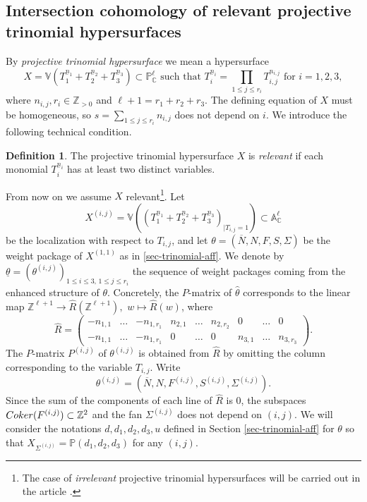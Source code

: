 \documentclass[11pt, reqno]{amsart}
\theoremstyle{plain}
\theoremstyle{definition}
\newtheorem{definition}[theorem]{Definition}
\theoremstyle{remark}
\begin{document}
\subsection{Intersection cohomology of relevant projective trinomial hypersurfaces}
By \emph{projective trinomial hypersurface} we mean a hypersurface
$$X  =  \mathbb{V}(T_{1}^{\underline{n}_{1}} + T_{2}^{\underline{n}_{2}} + T_{3}^{\underline{n}_{3}})\subset \mathbb{P}^{\ell}_{\mathbb{C}}\text{ such that }T_{i}^{\underline{n}_{i}} =  \prod_{1\leq j\leq r_{i}}T_{i, j}^{n_{i, j}} \text{ for }i = 1,2,3,$$
where $n_{i,j}, r_{i}\in\mathbb{Z}_{>0}$ and $\ell + 1 =  r_{1} + r_{2} + r_{3}$. The defining 
equation of $X$ must be homogeneous, so 
$s  =  \sum_{1\leq j\leq r_{i}} n_{i, j}$
does not depend on $i$. We introduce the following technical condition.
\begin{definition}
The projective trinomial hypersurface $X$ is \emph{relevant}
if each monomial $T_{i}^{\underline{n}_{i}}$ has at least two distinct variables.
\end{definition}

From now on we assume $X$ relevant\footnote{The case of \emph{irrelevant} projective trinomial hypersurfaces will be carried out in the article \cite{ABL}.}. Let  
$$X^{(i,j)} =  \mathbb{V}((T^{\underline{n}_{1}}_{1} + T^{\underline{n}_{2}}_{2} + T^{\underline{n}_{3}}_{3})_{|T_{i,j} = 1})\subset \mathbb{A}^{\ell}_{\mathbb{C}}$$
be the localization with respect to $T_{i,j}$, and let 
$\theta  =  (\overline{N}, N, F, S, \Sigma)$
be the weight package of $X^{(1,1)}$ as in \ref{sec-trinomial-aff}. We denote by
$\underline{\theta} =  (\theta^{(i,j)})_{ 1\leq i\leq 3,\,1\leq j\leq r_{i}}$
the sequence of weight packages coming from the enhanced structure of $\theta$.
Concretely, the $P$-matrix of $\widehat{\theta}$ corresponds to the linear map 
$\mathbb{Z}^{\ell+1}\rightarrow \widehat{R}(\mathbb{Z}^{\ell+1}),$ $w \mapsto \widehat{R}(w)$, where
$$ \widehat{R} =  \begin{pmatrix}
 -n_{1,1}& \ldots &  -n_{1, r_{1}} &  n_{2,1} &\ldots & n_{2,r_{2}} & 0& \ldots & 0\\
  -n_{1,1}& \ldots  &  -n_{1, r_{1}} &  0 &\ldots & 0 & n_{3,1} & \ldots & n_{3, r_{3}} 
\end{pmatrix}.$$
The $P$-matrix $P^{(i,j)}$ of $\theta^{(i,j)}$
is obtained from $\widehat{R}$ by omitting the column corresponding to the variable $T_{i,j}$. Write 
$$\theta^{(i,j)} = (\overline{N}, N, F^{(i,j)}, S^{(i,j)}, \Sigma^{(i,j)}).$$
Since the sum of the components of each line of $\widehat{R}$ is $0$, the subspaces ${\rm Coker}(F^{(i,j)})\subset \mathbb{Z}^{2}$ and the fan $\Sigma^{(i,j)}$ does not depend on $(i,j)$. We will consider the notations $d, d_{1}, d_{2}, d_{3}, u$ defined in Section \ref{sec-trinomial-aff} for $\theta$ so that $X_{\Sigma^{(i,j)}} =  \mathbb{P}(d_{1}, d_{2}, d_{3})$  for any $(i,j)$. 
\\
\end{document}
